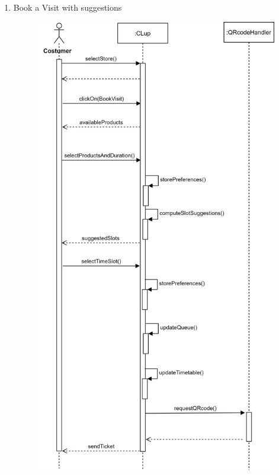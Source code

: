 \documentclass[]{article}
\begin{document}
\begin{enumerate}
						\item Book a Visit with suggestions
							\begin{figure}[H]
								\centering
								\includegraphics[scale=1]{bookWithSuggestions.png}
								\caption{}
								\label{fig:bookavisitsugg_sequencediagram}
							\end{figure}
							\newpage
						

\end{enumerate}
\end{document}
